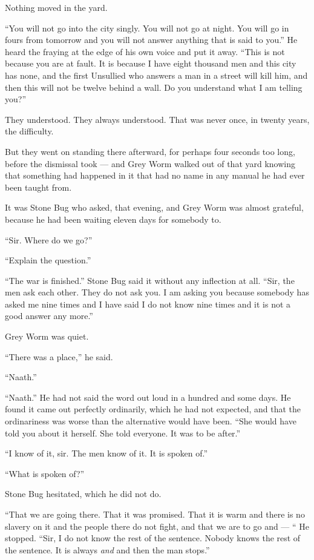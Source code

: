 Nothing moved in the yard.

“You will not go into the city singly. You will not go at night. You will go in fours from tomorrow and you will not answer anything that is said to you.” He heard the fraying at the edge of his own voice and put it away. “This is not because you are at fault. It is because I have eight thousand men and this city has none, and the first Unsullied who answers a man in a street will kill him, and then this will not be twelve behind a wall. Do you understand what I am telling you?”

They understood. They always understood. That was never once, in twenty years, the difficulty.

But they went on standing there afterward, for perhaps four seconds too long, before the dismissal took — and Grey Worm walked out of that yard knowing that something had happened in it that had no name in any manual he had ever been taught from.

\sceneBreak

It was Stone Bug who asked, that evening, and Grey Worm was almost grateful, because he had been waiting eleven days for somebody to.

“Sir. Where do we go?”

“Explain the question.”

“The war is finished.” Stone Bug said it without any inflection at all. “Sir, the men ask each other. They do not ask you. I am asking you because somebody has asked me nine times and I have said I do not know nine times and it is not a good answer any more.”

Grey Worm was quiet.

“There was a place,” he said.

“Naath.”

“Naath.” He had not said the word out loud in a hundred and some days. He found it came out perfectly ordinarily, which he had not expected, and that the ordinariness was worse than the alternative would have been. “She would have told you about it herself. She told everyone. It was to be after.”

“I know of it, sir. The men know of it. It is spoken of.”

“What is spoken of?”

Stone Bug hesitated, which he did not do.

“That we are going there. That it was promised. That it is warm and there is no slavery on it and the people there do not fight, and that we are to go and — “ He stopped. “Sir, I do not know the rest of the sentence. Nobody knows the rest of the sentence. It is always \textit{and} and then the man stops.”

